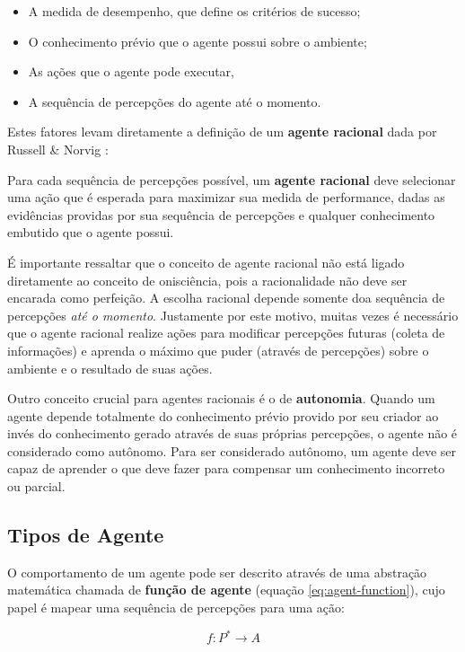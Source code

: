 \begin{itemize}
	\item A medida de desempenho, que define os critérios de sucesso;
	\item O conhecimento prévio que o agente possui sobre o ambiente;
	\item As ações que o agente pode executar,
	\item A sequência de percepções do agente até o momento.
\end{itemize}

Estes fatores levam diretamente a definição de um \textbf{agente racional} dada
por Russell \& Norvig \cite{RussellNorvig200912}:

\begin{directcite}
	Para cada sequência de percepções possível, um \textbf{agente racional} deve
	selecionar uma ação que é esperada para maximizar sua medida de performance,
	dadas as evidências providas por sua sequência de percepções e qualquer
	conhecimento embutido que o agente possui.
\end{directcite}

É importante ressaltar que o conceito de agente racional não está ligado
diretamente ao conceito de onisciência, pois a racionalidade não deve ser
encarada como perfeição. A escolha racional depende somente doa sequência de
percepções \textit{até o momento}. Justamente por este motivo, muitas vezes é
necessário que o agente racional realize ações para modificar percepções futuras
(coleta de informações) e aprenda o máximo que puder (através de percepções)
sobre o ambiente e o resultado de suas ações.

Outro conceito crucial para agentes racionais é o de \textbf{autonomia}. Quando
um agente depende totalmente do conhecimento prévio provido por seu criador ao
invés do conhecimento gerado através de suas próprias percepções, o agente não é
considerado como autônomo. Para ser considerado autônomo, um agente deve ser
capaz de aprender o que deve fazer para compensar um conhecimento incorreto ou
parcial. 

\subsection{Tipos de Agente}
O comportamento de um agente pode ser descrito através de uma abstração
matemática chamada de \textbf{função de agente} (equação
\ref{eq:agent-function}), cujo papel é mapear uma sequência de percepções para
uma ação:

\begin{equation}
	\label{eq:agent-function}
	f : P^* \rightarrow A
\end{equation}

